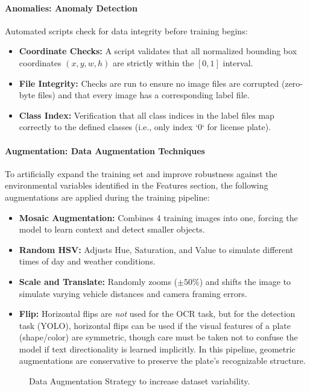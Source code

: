 \paragraph{Anomalies: Anomaly Detection}
Automated scripts check for data integrity before training begins:
\begin{itemize}
	\item \textbf{Coordinate Checks:} A script validates that all normalized bounding box coordinates $(x, y, w, h)$ are strictly within the $[0, 1]$ interval.
	\item \textbf{File Integrity:} Checks are run to ensure no image files are corrupted (zero-byte files) and that every image has a corresponding label file.
	\item \textbf{Class Index:} Verification that all class indices in the label files map correctly to the defined classes (i.e., only index `0` for license plate).
\end{itemize}

\paragraph{Augmentation: Data Augmentation Techniques}
To artificially expand the training set and improve robustness against the environmental variables identified in the Features section, the following augmentations are applied during the training pipeline:
\begin{itemize}
	\item \textbf{Mosaic Augmentation:} Combines 4 training images into one, forcing the model to learn context and detect smaller objects.
	\item \textbf{Random HSV:} Adjusts Hue, Saturation, and Value to simulate different times of day and weather conditions.
	\item \textbf{Scale and Translate:} Randomly zooms ($\pm 50\%$) and shifts the image to simulate varying vehicle distances and camera framing errors.
	\item \textbf{Flip:} Horizontal flips are \textit{not} used for the OCR task, but for the detection task (YOLO), horizontal flips can be used if the visual features of a plate (shape/color) are symmetric, though care must be taken not to confuse the model if text directionality is learned implicitly. In this pipeline, geometric augmentations are conservative to preserve the plate's recognizable structure.
\end{itemize}

\begin{figure}[htbp]
	\centering
	
	\caption{Data Augmentation Strategy to increase dataset variability.}
	\label{fig:augmentation_strategy}
\end{figure}

